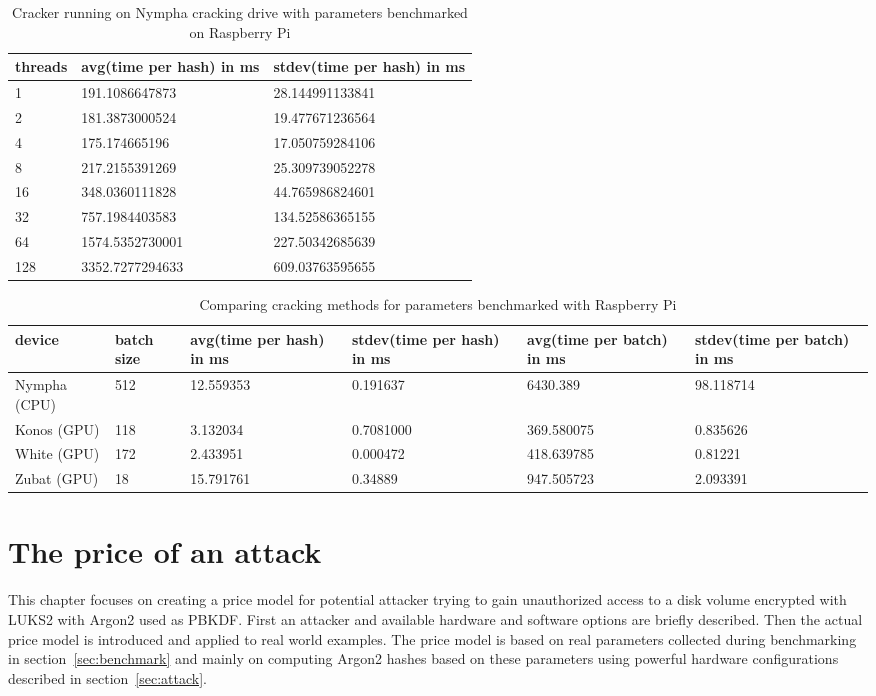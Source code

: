 \documentclass[nolof]{fithesis3}
\begin{document}
\noindent
\begin{table}
\caption{Cracker running on Nympha cracking drive with parameters benchmarked on Raspberry Pi}
\label{tab:nymphacrackerrpi}
\begin{tabularx}{\textwidth}{| X | X | X |}
\hline
threads & avg(time per hash) in ms & stdev(time per hash) in ms\\
\hline
1 & 191.1086647873 & 28.144991133841\\
\hline
2 & 181.3873000524 & 19.477671236564\\
\hline
4 & 175.174665196 & 17.050759284106\\
\hline
8 & 217.2155391269 & 25.309739052278\\
\hline
16 & 348.0360111828 & 44.765986824601\\
\hline
32 & 757.1984403583 & 134.52586365155\\
\hline
64 & 1574.5352730001 & 227.50342685639\\
\hline
128 & 3352.7277294633 & 609.03763595655\\
\hline
\end{tabularx}
\end{table}

\noindent
\begin{table}
\caption{Comparing cracking methods for parameters benchmarked with Raspberry Pi}
\label{tab:rpicrack}
\begin{tabularx}{\textwidth}{| X | X | X | X | X | X |}
\hline
device & batch size & avg(time per hash) in ms & stdev(time per hash) in ms & avg(time per batch) in ms & stdev(time per batch) in ms\\
\hline
Nympha (CPU) & 512 & 12.559353 & 0.191637 & 6430.389 & 98.118714\\
\hline
Konos (GPU) & 118 & 3.132034 & 0.7081000 & 369.580075 & 0.835626\\
\hline
White (GPU) & 172 & 2.433951 & 0.000472 & 418.639785 & 0.81221\\
\hline
Zubat (GPU) & 18 & 15.791761 & 0.34889 & 947.505723 & 2.093391\\
\hline
\end{tabularx}
\end{table}



\chapter{The price of an attack}
\label{chap:model}
This chapter focuses on creating a price model for potential attacker trying to gain unauthorized access to a disk volume encrypted with LUKS2 with Argon2 used as PBKDF. First an attacker and available hardware and software options are briefly described. Then the actual price model is introduced and applied to real world examples. The price model is based on real parameters collected during benchmarking in section~\ref{sec:benchmark} and mainly on computing Argon2 hashes based on these parameters using powerful hardware configurations described in section~\ref{sec:attack}.
\end{document}

